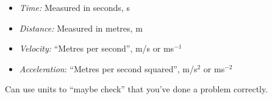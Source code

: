 \documentclass[10pt]{scrartcl}
\begin{document}
\begin{definition}[SI Units]\begin{itemize}
\item \emph{Time:} Measured in seconds, s

\item \emph{Distance:} Measured in metres, m

\item \emph{Velocity:} ``Metres per second'', m/s or ms$^{-1}$
	
\item \emph{Acceleration}: ``Metres per second squared'', m/s$^2$ or ms$^{-2}$
\end{itemize}
\end{definition}\vsp

Can use units to ``maybe check'' that you've done a problem correctly.\\

\end{document}
